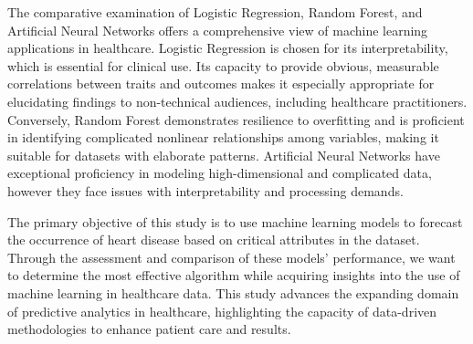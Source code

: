 The comparative examination of Logistic Regression, Random Forest, and Artificial Neural Networks offers a comprehensive view of machine learning applications in healthcare. Logistic Regression is chosen for its interpretability, which is essential for clinical use. Its capacity to provide obvious, measurable correlations between traits and outcomes makes it especially appropriate for elucidating findings to non-technical audiences, including healthcare practitioners. Conversely, Random Forest demonstrates resilience to overfitting and is proficient in identifying complicated nonlinear relationships among variables, making it suitable for datasets with elaborate patterns. Artificial Neural Networks have exceptional proficiency in modeling high-dimensional and complicated data, however they face issues with interpretability and processing demands.

The primary objective of this study is to use machine learning models to forecast the occurrence of heart disease based on critical attributes in the dataset. Through the assessment and comparison of these models' performance, we want to determine the most effective algorithm while acquiring insights into the use of machine learning in healthcare data. This study advances the expanding domain of predictive analytics in healthcare, highlighting the capacity of data-driven methodologies to enhance patient care and results.

